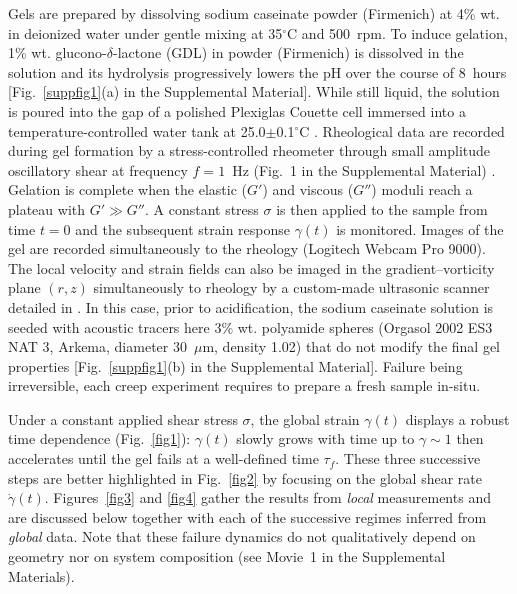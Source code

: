 \documentclass[twocolumn,superscriptaddress,showpacs,preprintnumbers,amsmath,amssymb,prl]{revtex4}
\newcommand\gp{\dot\gamma}
\begin{document}
Gels are prepared by dissolving sodium caseinate powder (Firmenich) at 4\% wt. in deionized water under gentle mixing at 35$^{\circ}$C and 500~rpm. To induce gelation, 1\% wt. glucono-$\delta$-lactone (GDL) in powder (Firmenich) is dissolved in the solution and its hydrolysis progressively lowers the pH over the course of 8~hours [Fig.~\ref{suppfig1}(a) in the Supplemental Material]. While still liquid, the solution is poured into the gap of a polished Plexiglas Couette cell immersed into a temperature-controlled water tank at 25.0$\pm$0.1$^{\circ}$C \cite{note}. Rheological data are recorded during gel formation by a stress-controlled rheometer through small amplitude oscillatory shear at frequency $f=1$~Hz (Fig.~1 in the Supplemental Material) \cite{note}. Gelation is complete when the elastic ($G'$) and viscous ($G''$) moduli reach a plateau with $G'\gg G''$. A constant stress $\sigma$ is then applied to the sample from time $t=0$ and the subsequent strain response $\gamma(t)$ is monitored. Images of the gel are recorded simultaneously to the rheology (Logitech Webcam Pro 9000). The local velocity and strain fields can also be imaged in the gradient--vorticity plane $(r,z)$ simultaneously to rheology by a custom-made ultrasonic scanner detailed in \cite{Gallot:2013}. In this case, prior to acidification, the sodium caseinate solution is seeded with acoustic tracers here 3\% wt. polyamide spheres (Orgasol 2002 ES3 NAT 3, Arkema, diameter 30~$\mu$m, density 1.02) that do not modify the final gel properties [Fig.~\ref{suppfig1}(b) in the Supplemental Material]. Failure being irreversible, each creep experiment requires to prepare a fresh sample in-situ.  

Under a constant applied shear stress $\sigma$, the global strain $\gamma(t)$ displays a robust time dependence (Fig.~\ref{fig1}): $\gamma(t)$ slowly grows with time up to $\gamma \sim 1$ then accelerates until the gel fails at a well-defined time $\tau_f$. These three successive steps are better highlighted in Fig.~\ref{fig2} by focusing on the global shear rate $\gp(t)$. Figures~\ref{fig3} and \ref{fig4} gather the results from {\it local} measurements and are discussed below together with each of the successive regimes inferred from {\it global} data. Note that these failure dynamics do not qualitatively depend on geometry nor on system composition (see Movie~1 in the Supplemental Materials).
\end{document}
